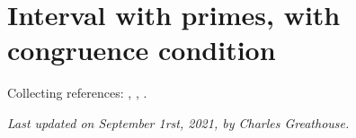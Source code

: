 \section{Interval with primes, with congruence condition}




Collecting references:
\cite{McCurley*84-2},
\cite{McCurley*84-3},
\cite{Kadiri*05-2}.

























  
\begin{flushright}\small\sl{}   Last updated on September 1rst, 2021, by Charles Greathouse.
 \end{flushright}














